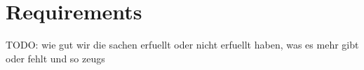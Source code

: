 \section{Requirements}\label{spec}

TODO: wie gut wir die sachen erfuellt oder nicht erfuellt haben, was es mehr gibt oder fehlt und so zeugs

